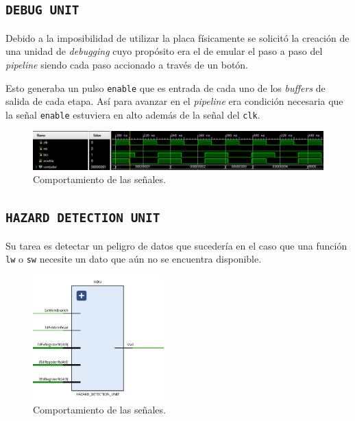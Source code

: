 \documentclass[a4paper]{article}
\begin{document}
\subsection{\texttt{DEBUG UNIT}}
Debido a la imposibilidad de utilizar la placa físicamente se solicitó la creación de una unidad de \textit{debugging} cuyo propósito era el de emular el paso a paso del \textit{pipeline} siendo cada paso accionado a través de un botón.

Esto generaba un pulso \texttt{enable} que es entrada de cada uno de los \textit{buffers} de salida de cada etapa. Así para avanzar en el \textit{pipeline} era condición necesaria que la señal \texttt{enable} estuviera en alto además de la señal del \texttt{clk}.

\begin{figure}[H]
	\begin{center}				
	\includegraphics[width=1\textwidth,center]{DU.png}
  	\caption{Comportamiento de las señales.}
  	\label{fig:funcionamiento.}
  	\end{center}
\end{figure}

\subsection{\texttt{HAZARD DETECTION UNIT}}
Su tarea es detectar un peligro de datos que sucedería en el caso que una función \texttt{lw} o \texttt{sw} necesite un dato que aún no se encuentra disponible. 

\begin{figure}[H]
	\begin{center}				
	\includegraphics[width=0.45\textwidth,center]{HDU.png}
  	\caption{Comportamiento de las señales.}
  	\label{fig:funcionamiento.}
  	\end{center}
\end{figure}
\end{document}
